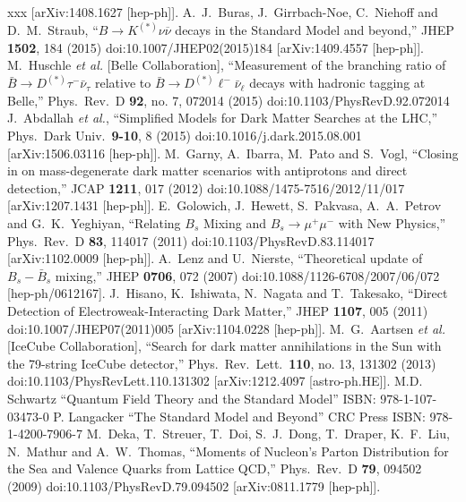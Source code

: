 \begin{thebibliography}{xxx}
  [arXiv:1408.1627 [hep-ph]].
  A.~J.~Buras, J.~Girrbach-Noe, C.~Niehoff and D.~M.~Straub,
  ``$ B\to {K}^{\left(\ast \right)}\nu \overline{\nu} $ decays in the Standard Model and beyond,''
  JHEP {\bf 1502}, 184 (2015)
  doi:10.1007/JHEP02(2015)184
  [arXiv:1409.4557 [hep-ph]].
    M.~Huschle {\it et al.} [Belle Collaboration],
  ``Measurement of the branching ratio of $\bar{B} \to D^{(\ast)} \tau^- \bar{\nu}_\tau$ relative to $\bar{B} \to D^{(\ast)} \ell^- \bar{\nu}_\ell$ decays with hadronic tagging at Belle,''
  Phys.\ Rev.\ D {\bf 92}, no. 7, 072014 (2015)
  doi:10.1103/PhysRevD.92.072014
    J.~Abdallah {\it et al.},
  ``Simplified Models for Dark Matter Searches at the LHC,''
  Phys.\ Dark Univ.\  {\bf 9-10}, 8 (2015)
  doi:10.1016/j.dark.2015.08.001
  [arXiv:1506.03116 [hep-ph]].
    M.~Garny, A.~Ibarra, M.~Pato and S.~Vogl,
  ``Closing in on mass-degenerate dark matter scenarios with antiprotons and direct detection,''
  JCAP {\bf 1211}, 017 (2012)
  doi:10.1088/1475-7516/2012/11/017
  [arXiv:1207.1431 [hep-ph]].
    E.~Golowich, J.~Hewett, S.~Pakvasa, A.~A.~Petrov and G.~K.~Yeghiyan,
  ``Relating $B_s$ Mixing and $B_s\to \mu^+\mu^-$ with New Physics,''
  Phys.\ Rev.\ D {\bf 83}, 114017 (2011)
  doi:10.1103/PhysRevD.83.114017
  [arXiv:1102.0009 [hep-ph]].
    A.~Lenz and U.~Nierste,
  ``Theoretical update of $B_s - \bar{B}_s$ mixing,''
  JHEP {\bf 0706}, 072 (2007)
  doi:10.1088/1126-6708/2007/06/072
  [hep-ph/0612167].
     J.~Hisano, K.~Ishiwata, N.~Nagata and T.~Takesako,
  ``Direct Detection of Electroweak-Interacting Dark Matter,''
  JHEP {\bf 1107}, 005 (2011)
  doi:10.1007/JHEP07(2011)005
  [arXiv:1104.0228 [hep-ph]].
    M.~G.~Aartsen {\it et al.} [IceCube Collaboration],
  ``Search for dark matter annihilations in the Sun with the 79-string IceCube detector,''
  Phys.\ Rev.\ Lett.\  {\bf 110}, no. 13, 131302 (2013)
  doi:10.1103/PhysRevLett.110.131302
  [arXiv:1212.4097 [astro-ph.HE]].
  M.D. Schwartz ``Quantum Field Theory and the Standard Model'' ISBN: 978-1-107-03473-0
  P. Langacker ``The Standard Model and Beyond'' CRC Press ISBN: 978-1-4200-7906-7
   M.~Deka, T.~Streuer, T.~Doi, S.~J.~Dong, T.~Draper, K.~F.~Liu, N.~Mathur and A.~W.~Thomas,
  ``Moments of Nucleon's Parton Distribution for the Sea and Valence Quarks from Lattice QCD,''
  Phys.\ Rev.\ D {\bf 79}, 094502 (2009)
  doi:10.1103/PhysRevD.79.094502
  [arXiv:0811.1779 [hep-ph]].

\end{thebibliography}
